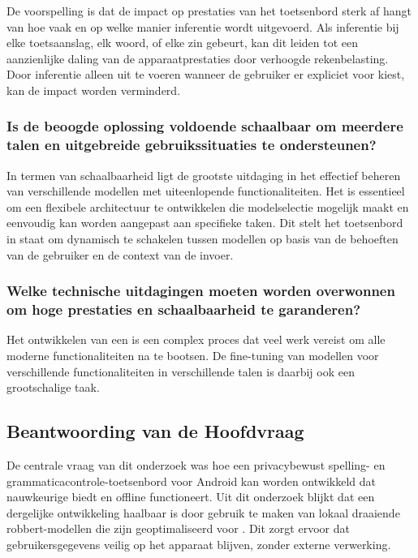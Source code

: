 De voorspelling is dat de impact op prestaties van het toetsenbord sterk af hangt van hoe vaak en op welke manier inferentie wordt uitgevoerd. Als inferentie bij elke toetsaanslag, elk woord, of elke zin gebeurt, kan dit leiden tot een aanzienlijke daling van de apparaatprestaties door verhoogde rekenbelasting. Door inferentie alleen uit te voeren wanneer de gebruiker er expliciet voor kiest, kan de impact worden verminderd.

\subsubsection{Is de beoogde oplossing voldoende schaalbaar om meerdere talen en uitgebreide gebruikssituaties te ondersteunen?}

In termen van schaalbaarheid ligt de grootste uitdaging in het effectief beheren van verschillende modellen met uiteenlopende functionaliteiten. Het is essentieel om een flexibele architectuur te ontwikkelen die modelselectie mogelijk maakt en eenvoudig kan worden aangepast aan specifieke taken. Dit stelt het toetsenbord in staat om dynamisch te schakelen tussen modellen op basis van de behoeften van de gebruiker en de context van de invoer.

\subsubsection{Welke technische uitdagingen moeten worden overwonnen om hoge prestaties en schaalbaarheid te garanderen?}

Het ontwikkelen van een  is een complex proces dat veel werk vereist om alle moderne functionaliteiten na te bootsen.  De \gls{fine-tuning} van modellen voor verschillende functionaliteiten in verschillende talen is daarbij ook een grootschalige taak.

\subsection{Beantwoording van de Hoofdvraag}

De centrale vraag van dit onderzoek was hoe een privacybewust spelling- en gram\-matica\-controle-toetsenbord voor Android kan worden ontwikkeld dat nauwkeurige  biedt en offline functioneert. Uit dit onderzoek blijkt dat een dergelijke ontwikkeling haalbaar is door gebruik te maken van lokaal draaiende \gls{robbert}-modellen die zijn geoptimaliseerd voor . Dit zorgt ervoor dat gebruikersgegevens veilig op het apparaat blijven, zonder externe verwerking.

